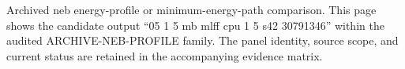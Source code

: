 Archived neb energy-profile or minimum-energy-path comparison. This page shows the candidate output ``05 1 5 mb mlff cpu 1 5 s42 30791346'' within the audited ARCHIVE-NEB-PROFILE family. The panel identity, source scope, and current status are retained in the accompanying evidence matrix.
